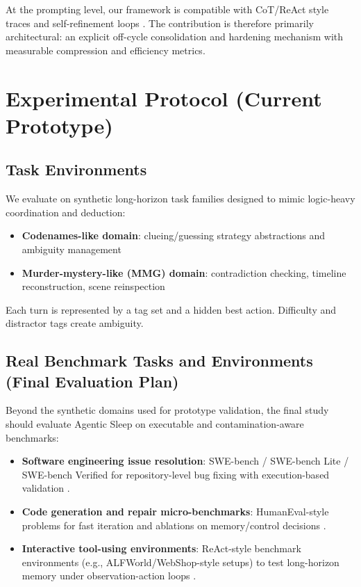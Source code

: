 \documentclass{article}
\begin{document}
At the prompting level, our framework is compatible with CoT/ReAct style traces and self-refinement loops \citep{wei2022cot, yao2023react, madaan2023selfrefine}. The contribution is therefore primarily architectural: an explicit off-cycle consolidation and hardening mechanism with measurable compression and efficiency metrics.

\section{Experimental Protocol (Current Prototype)}

\subsection{Task Environments}

We evaluate on synthetic long-horizon task families designed to mimic logic-heavy coordination and deduction:

\begin{itemize}[leftmargin=1.25em]
\item \textbf{Codenames-like domain}: clueing/guessing strategy abstractions and ambiguity management
\item \textbf{Murder-mystery-like (MMG) domain}: contradiction checking, timeline reconstruction, scene reinspection
\end{itemize}

Each turn is represented by a tag set and a hidden best action. Difficulty and distractor tags create ambiguity.

\subsection{Real Benchmark Tasks and Environments (Final Evaluation Plan)}

Beyond the synthetic domains used for prototype validation, the final study should evaluate Agentic Sleep on executable and contamination-aware benchmarks:

\begin{itemize}[leftmargin=1.25em]
\item \textbf{Software engineering issue resolution}: SWE-bench / SWE-bench Lite / SWE-bench Verified for repository-level bug fixing with execution-based validation \citep{jimenez2024swebench}.
\item \textbf{Code generation and repair micro-benchmarks}: HumanEval-style problems for fast iteration and ablations on memory/control decisions \citep{chen2021codex}.
\item \textbf{Interactive tool-using environments}: ReAct-style benchmark environments (e.g., ALFWorld/WebShop-style setups) to test long-horizon memory under observation-action loops \citep{yao2023react}.
\end{itemize}
\end{document}
